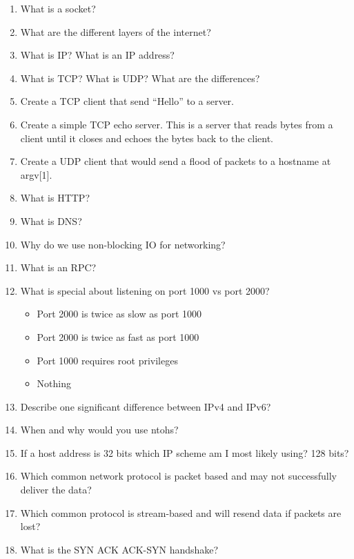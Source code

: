 \begin{enumerate}

\item What is a socket?
\item What are the different layers of the internet?
\item What is IP? What is an IP address?
\item What is TCP? What is UDP? What are the differences?
\item Create a TCP client that send ``Hello'' to a server.
\item Create a simple TCP echo server. This is a server that reads bytes from a client until it closes and echoes the bytes back to the client.
\item Create a UDP client that would send a flood of packets to a hostname at argv[1].
\item What is HTTP?
\item What is DNS?
\item Why do we use non-blocking IO for networking?
\item What is an RPC?
\item What is special about listening on port 1000 vs port 2000?

\begin{itemize}
\tightlist
\item
  Port 2000 is twice as slow as port 1000
\item
  Port 2000 is twice as fast as port 1000
\item
  Port 1000 requires root privileges
\item
  Nothing
\end{itemize}

\item Describe one significant difference between IPv4 and IPv6?

\item When and why would you use ntohs?

\item If a host address is 32 bits which IP scheme am I most likely using? 128 bits?

\item Which common network protocol is packet based and may not successfully deliver the data?

\item Which common protocol is stream-based and will resend data if packets are lost?

\item What is the SYN ACK ACK-SYN handshake?


\end{enumerate}
